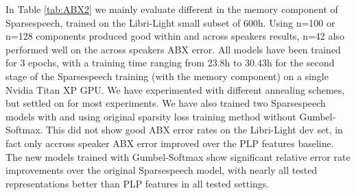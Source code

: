 \documentclass[a4paper]{article}
\begin{document}
In Table \ref{tab:ABX2} we mainly evaluate different  in the memory component of Sparsespeech, trained on the Libri-Light small subset of 600h. Using n=100 or n=128 components produced good within and across speakers results, n=42 also performed well on the across speakers ABX error. All models have been trained for 3 epochs, with a training time ranging from 23.8h to 30.43h for the second stage of the Sparsespeech training (with the memory component) on a single Nvidia Titan XP GPU. We have experimented with different annealing schemes, but settled on  for most experiments. We have also trained two Sparsespeech models with  and  using original sparsity loss training method without Gumbel-Softmax. This did not show good ABX error rates on the Libri-Light dev set, in fact only accross speaker ABX error improved over the PLP features baseline. The new models trained with Gumbel-Softmax show significant relative error rate improvements over the original Sparsespeech model, with nearly all tested representations better than PLP features in all tested settings.
\end{document}
